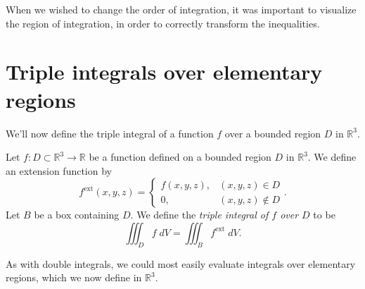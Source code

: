 \documentclass{ximera}
\begin{document}
When we wished to change the order of integration, it was important to visualize the region of integration, in order to correctly transform the inequalities.

\section*{Triple integrals over elementary regions}

We'll now define the triple integral of a function $f$ over a bounded region $D$ in $\mathbb{R}^3$.

\begin{definition}
Let $f:D\subset\mathbb{R}^3\rightarrow\mathbb{R}$ be a function defined on a bounded region $D$ in $\mathbb{R}^3$. We define an extension function by
\[
f^{\text{ext}}(x,y,z) = \begin{cases}
f(x,y,z), & (x,y,z)\in D\\
0, & (x,y,z)\notin D
\end{cases}.
\]
Let $B$ be a box containing $D$. We define the \emph{triple integral of $f$ over $D$} to be
\[
\iiint_D f\;dV = \iiint_B f^{\text{ext}}\;dV.
\]
\end{definition}

As with double integrals, we could most easily evaluate integrals over elementary regions, which we now define in $\mathbb{R}^3$.
\end{document}
